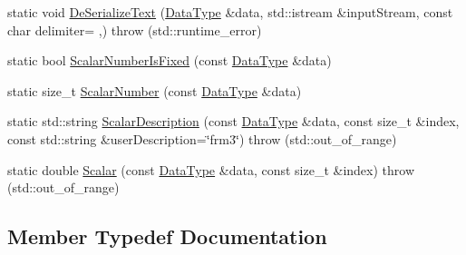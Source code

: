 \begin{DoxyCompactItemize}
\item 
static void \hyperlink{classcmn_data_3_01vct_frame_base_3_01__rotation_type_01_4_01_4_a5ca9678bb39c6a214166fafe958fe07f}{De\+Serialize\+Text} (\hyperlink{classcmn_data_3_01vct_frame_base_3_01__rotation_type_01_4_01_4_a6d3becc05b41db88283c842177d23bea}{Data\+Type} \&data, std\+::istream \&input\+Stream, const char delimiter= \textquotesingle{},\textquotesingle{})  throw (std\+::runtime\+\_\+error)
\item 
static bool \hyperlink{classcmn_data_3_01vct_frame_base_3_01__rotation_type_01_4_01_4_aed8e8d3ef360eac67bd60ced6f5e2cf6}{Scalar\+Number\+Is\+Fixed} (const \hyperlink{classcmn_data_3_01vct_frame_base_3_01__rotation_type_01_4_01_4_a6d3becc05b41db88283c842177d23bea}{Data\+Type} \&data)
\item 
static size\+\_\+t \hyperlink{classcmn_data_3_01vct_frame_base_3_01__rotation_type_01_4_01_4_a2e9b4a5543d322748194b62eebcaccd1}{Scalar\+Number} (const \hyperlink{classcmn_data_3_01vct_frame_base_3_01__rotation_type_01_4_01_4_a6d3becc05b41db88283c842177d23bea}{Data\+Type} \&data)
\item 
static std\+::string \hyperlink{classcmn_data_3_01vct_frame_base_3_01__rotation_type_01_4_01_4_ab0c8cb32d33f7b3f6b7d89098fc1b6e3}{Scalar\+Description} (const \hyperlink{classcmn_data_3_01vct_frame_base_3_01__rotation_type_01_4_01_4_a6d3becc05b41db88283c842177d23bea}{Data\+Type} \&data, const size\+\_\+t \&index, const std\+::string \&user\+Description=\char`\"{}frm3\char`\"{})  throw (std\+::out\+\_\+of\+\_\+range)
\item 
static double \hyperlink{classcmn_data_3_01vct_frame_base_3_01__rotation_type_01_4_01_4_a15ca452dc355cfa4ad26fea3cf7d632c}{Scalar} (const \hyperlink{classcmn_data_3_01vct_frame_base_3_01__rotation_type_01_4_01_4_a6d3becc05b41db88283c842177d23bea}{Data\+Type} \&data, const size\+\_\+t \&index)  throw (std\+::out\+\_\+of\+\_\+range)
\end{DoxyCompactItemize}


\subsection{Member Typedef Documentation}
\hypertarget{classcmn_data_3_01vct_frame_base_3_01__rotation_type_01_4_01_4_a6d3becc05b41db88283c842177d23bea}{}
